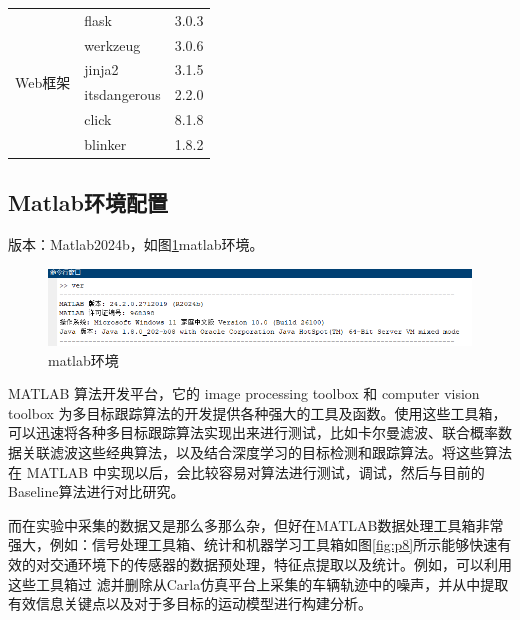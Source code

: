 \begin{table}[htbp]
\begin{tabular}{lll}
		\hline
		\multirow{6}{*}{Web框架}
		& flask & 3.0.3 \\
		& werkzeug & 3.0.6 \\
		& jinja2 & 3.1.5 \\
		& itsdangerous & 2.2.0 \\
		& click & 8.1.8 \\
		& blinker & 1.8.2 \\
		
		
		
		\hline
	\end{tabular}
\end{table}


\subsection{Matlab环境配置}

版本：Matlab2024b，如图\ref{fig:p7}matlab环境。


\begin{figure}[htbp] %
	\centering
	\includegraphics[width=1\textwidth]{p7} %
	\caption{matlab环境} %
	\label{fig:p7} %
\end{figure}


MATLAB 算法开发平台，它的 image processing toolbox 和 computer vision toolbox 为多目标跟踪算法的开发提供各种强大的工具及函数。使用这些工具箱，可以迅速将各种多目标跟踪算法实现出来进行测试，比如卡尔曼滤波、联合概率数据关联滤波这些经典算法，以及结合深度学习的目标检测和跟踪算法。将这些算法在 MATLAB 中实现以后，会比较容易对算法进行测试，调试，然后与目前的Baseline算法进行对比研究。


而在实验中采集的数据又是那么多那么杂，但好在MATLAB数据处理工具箱非常强大，例如：信号处理工具箱、统计和机器学习工具箱如图\ref{fig:p8}所示能够快速有效的对交通环境下的传感器的数据预处理，特征点提取以及统计。例如，可以利用这些工具箱过 滤并删除从Carla仿真平台上采集的车辆轨迹中的噪声，并从中提取有效信息关键点以及对于多目标的运动模型进行构建分析。




